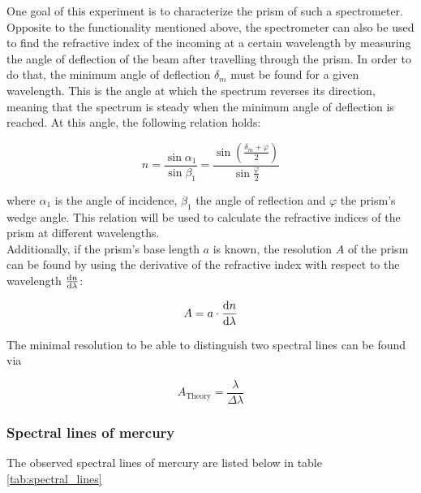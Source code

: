 \documentclass{scrreprt}
\renewcommand{\phi}{\varphi}
\begin{document}
One goal of this experiment is to characterize the prism of such a spectrometer. Opposite to the functionality mentioned above, the spectrometer can also be used to find the refractive index of the incoming at a certain wavelength by measuring the angle of deflection of the beam after travelling through the prism. In order to do that, the minimum angle of deflection $\delta_m$ must be found for a given wavelength. This is the angle at which the spectrum reverses its direction, meaning that the spectrum is steady when the minimum angle of deflection is reached. At this angle, the following relation holds:

\begin{equation}\label{eq:index}
n = \frac{\sin\alpha_1}{\sin\beta_1} = \frac{\sin{\left(\frac{\delta_m+\phi}{2} \right)}}{\sin{\frac{\phi}{2}}}
\end{equation}

where $\alpha_1$ is the angle of incidence, $\beta_1$ the angle of reflection and $\phi$ the prism's wedge angle. This relation will be used to calculate the refractive indices of the prism at different wavelengths.\\

Additionally, if the prism's base length $a$ is known, the resolution $A$ of the prism can be found by using the derivative of the refractive index with respect to the wavelength $\frac{\dif n}{\dif \lambda}$:

\begin{equation}\label{eq:resolution_calc}
A = a\cdot \frac{\dif n}{\dif \lambda}
\end{equation}

The minimal resolution to be able to distinguish two spectral lines can be found via 

\begin{equation}\label{eq:resolution_theory}
A_{\text{Theory}} = \frac{\lambda}{\Delta \lambda}
\end{equation}

\subsubsection{Spectral lines of mercury}

The observed spectral lines of mercury are listed below in table \ref{tab:spectral_lines}
\end{document}
